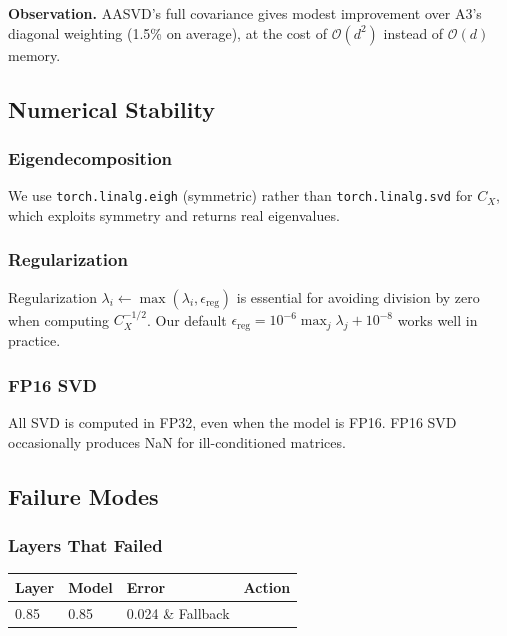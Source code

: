\textbf{Observation.} AASVD's full covariance gives modest improvement over A3's 
diagonal weighting (1.5\% on average), at the cost of 
$\mathcal{O}(d^2)$ instead of $\mathcal{O}(d)$ memory.

\subsection{Numerical Stability}

\subsubsection{Eigendecomposition}

We use \texttt{torch.linalg.eigh} (symmetric) rather than \texttt{torch.linalg.svd} for 
$C_X$, which exploits symmetry and returns real eigenvalues.

\subsubsection{Regularization}

Regularization $\lambda_i \leftarrow \max(\lambda_i, \epsilon_\text{reg})$ is 
essential for avoiding division by zero when computing $C_X^{-1/2}$. Our 
default $\epsilon_\text{reg} = 10^{-6} \max_j \lambda_j + 10^{-8}$ works 
well in practice.

\subsubsection{FP16 SVD}

All SVD is computed in FP32, even when the model is FP16. FP16 SVD 
occasionally produces NaN for ill-conditioned matrices.

\subsection{Failure Modes}

\subsubsection{Layers That Failed}

\begin{table}[H]
\centering
\small
\begin{tabular}{llll}
\toprule
\textbf{Layer} & \textbf{Model} & \textbf{Error} & \textbf{Action} \\
\midrule
0.85 & 0.85 & 0.024 \& Fallback \\
\bottomrule
\end{tabular}
\end{table}

